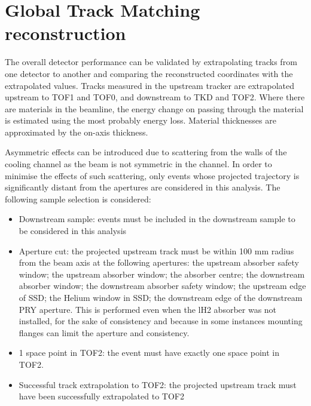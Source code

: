 \graphicspath{{08-Track-matching/Figures/}}

\section{Global Track Matching reconstruction}
\label{Sect:TM}


\newcommand{\topmatterallplots}[4]{%
    \hspace*{-2.0cm}\texttt{[image: \#1/Figures/\#2/\#3.png]}
    \caption{#4 \label{fig:#3}}
    }

The overall detector performance can be validated by extrapolating tracks from
one detector to another and comparing the reconstructed coordinates with the 
extrapolated values.
Tracks measured in the upstream tracker are extrapolated upstream to TOF1 and TOF0, and downstream
to TKD and TOF2. Where there are materials in the beamline, the energy change on
passing through the material is estimated using the most probably energy loss. 
Material thicknesses are approximated by the on-axis thickness. 

Asymmetric effects can be introduced due to scattering from the walls of the
cooling channel as the beam is not symmetric in the channel. In order to 
minimise the effects of such scattering, only events whose projected 
trajectory is  significantly distant from the apertures are considered in this 
analysis. The following sample selection is considered:

\begin{itemize}
\item{Downstream sample:} events must be included in the downstream sample to
be considered in this analysis
\item{Aperture cut:} the projected upstream track must be within 100 mm radius 
from the beam axis at the following apertures: the upstream absorber safety window;
the upstream absorber window; the absorber centre; the downstream absorber window;
the downstream absorber safety window; the upstream edge of SSD; the Helium window
in SSD; the downstream edge of the downstream PRY aperture. This is performed
even when the lH2 absorber was not installed, for the sake of consistency and
because in some instances mounting flanges can limit the aperture and consistency.
\item{1 space point in TOF2:} the event must have exactly one space point in TOF2.
\item{Successful track extrapolation to TOF2:} the projected upstream track must
have been successfully extrapolated to TOF2
\end{itemize}

